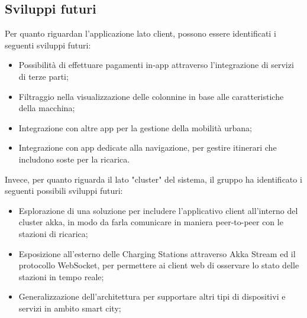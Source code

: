 \subsection{Sviluppi futuri}

Per quanto riguardan l'applicazione lato client, possono essere identificati i seguenti sviluppi futuri:

\begin{itemize}
    \item Possibilità di effettuare pagamenti in-app attraverso l'integrazione di servizi di terze parti;
    \item Filtraggio nella visualizzazione delle colonnine in base alle caratteristiche della macchina;
    \item Integrazione con altre app per la gestione della mobilità urbana;
    \item Integrazione con app dedicate alla navigazione, per gestire itinerari che includono soste per la ricarica.
\end{itemize}

Invece, per quanto riguarda il lato "cluster" del sistema, il gruppo ha identificato i seguenti possibili sviluppi futuri:

\begin{itemize}
    \item Esplorazione di una soluzione per includere l'applicativo client all'interno del cluster akka, in modo da farla comunicare in maniera peer-to-peer con le stazioni di ricarica;
    \item Esposizione all'esterno delle Charging Stations attraverso Akka Stream ed il protocollo WebSocket, per permettere ai client web di osservare lo stato delle stazioni in tempo reale;
    \item Generalizzazione dell'architettura per supportare altri tipi di dispositivi e servizi in ambito smart city;
\end{itemize}

\newpage